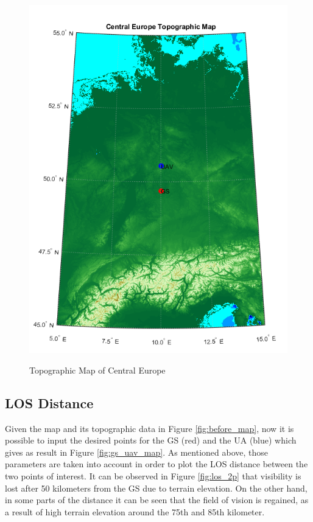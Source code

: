 \begin{figure}[H]
{  \includegraphics[scale=0.43]{figures/gs_uav_map.png}
  \label{fig:gs_uav_map}}
  \hfill
  \caption{Topographic Map of Central Europe}\label{fig:eu_map}
\end{figure}

\subsection{LOS Distance}
Given the map and its topographic data in Figure \ref{fig:before_map}, now it is possible to input the desired points for the GS (red) and the UA (blue) which gives as result in Figure \ref{fig:gs_uav_map}. As mentioned above, those parameters are taken into account in order to plot the LOS distance between the two points of interest. It can be observed in Figure \ref{fig:los_2p} that visibility is lost after 50 kilometers from the GS due to terrain elevation. On the other hand, in some parts of the distance it can be seen that the field of vision is regained, as a result of high terrain elevation around the 75th and 85th kilometer.

